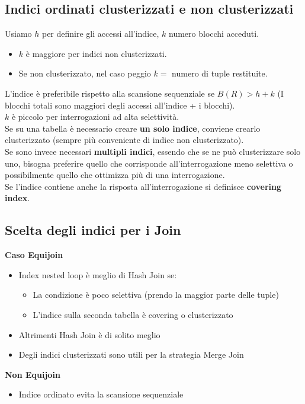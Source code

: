 \subsection{Indici ordinati clusterizzati e non clusterizzati}
Usiamo $h$ per definire gli accessi all'indice, $k$ numero blocchi acceduti.
\begin{itemize}
    \item $k$ \`e maggiore per indici non clusterizzati.
    \item Se non clusterizzato, nel caso peggio $k =$ numero di tuple restituite.
\end{itemize}
L'indice \`e preferibile rispetto alla scansione sequenziale se $B(R) > h + k$ (I blocchi totali sono maggiori degli accessi all'indice + i blocchi).\\
$k$ \`e piccolo per interrogazioni ad alta selettività.\\
Se su una tabella è necessario creare \textbf{un solo indice}, conviene crearlo clusterizzato (sempre più conveniente di indice non clusterizzato).\\
Se sono invece necessari \textbf{multipli indici}, essendo che se ne può clusterizzare solo uno, bisogna preferire quello che corrisponde all'interrogazione meno selettiva o possibilmente quello che ottimizza più di una interrogazione.\vspace{2mm} \\
Se l'indice contiene anche la risposta all'interrogazione si definisce \textbf{covering index}.

\subsection{Scelta degli indici per i Join}
\textbf{Caso Equijoin}
\begin{itemize}
    \item Index nested loop \`e meglio di Hash Join se:
    \begin{itemize}
        \item La condizione \`e poco selettiva (prendo la maggior parte delle tuple)
        \item L'indice sulla seconda tabella \`e covering o clusterizzato
    \end{itemize}
    
    \item Altrimenti Hash Join \`e di solito meglio
    \item Degli indici clusterizzati sono utili per la strategia Merge Join
\end{itemize}

\noindent \textbf{Non Equijoin}
\begin{itemize}
    \item Indice ordinato evita la scansione sequenziale
\end{itemize}
